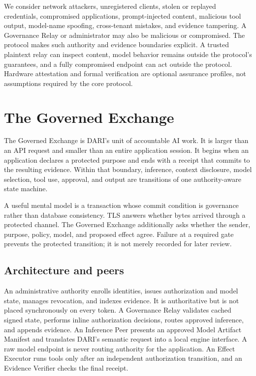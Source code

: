 \documentclass[10pt]{article}
\begin{document}
We consider network attackers, unregistered clients, stolen or replayed credentials, compromised applications, prompt-injected content, malicious tool output, model-name spoofing, cross-tenant mistakes, and evidence tampering. A Governance Relay or administrator may also be malicious or compromised. The protocol makes such authority and evidence boundaries explicit. A trusted plaintext relay can inspect content, model behavior remains outside the protocol's guarantees, and a fully compromised endpoint can act outside the protocol. Hardware attestation and formal verification are optional assurance profiles, not assumptions required by the core protocol.

\section{The Governed Exchange}

The Governed Exchange is DARI's unit of accountable AI work. It is larger than an API request and smaller than an entire application session. It begins when an application declares a protected purpose and ends with a receipt that commits to the resulting evidence. Within that boundary, inference, context disclosure, model selection, tool use, approval, and output are transitions of one authority-aware state machine.

A useful mental model is a transaction whose commit condition is governance rather than database consistency. TLS answers whether bytes arrived through a protected channel. The Governed Exchange additionally asks whether the sender, purpose, policy, model, and proposed effect agree. Failure at a required gate prevents the protected transition; it is not merely recorded for later review.

\subsection{Architecture and peers}

An administrative authority enrolls identities, issues authorization and model state, manages revocation, and indexes evidence. It is authoritative but is not placed synchronously on every token. A Governance Relay validates cached signed state, performs inline authorization decisions, routes approved inference, and appends evidence. An Inference Peer presents an approved Model Artifact Manifest and translates DARI's semantic request into a local engine interface. A raw model endpoint is never routing authority for the application. An Effect Executor runs tools only after an independent authorization transition, and an Evidence Verifier checks the final receipt.
\end{document}
